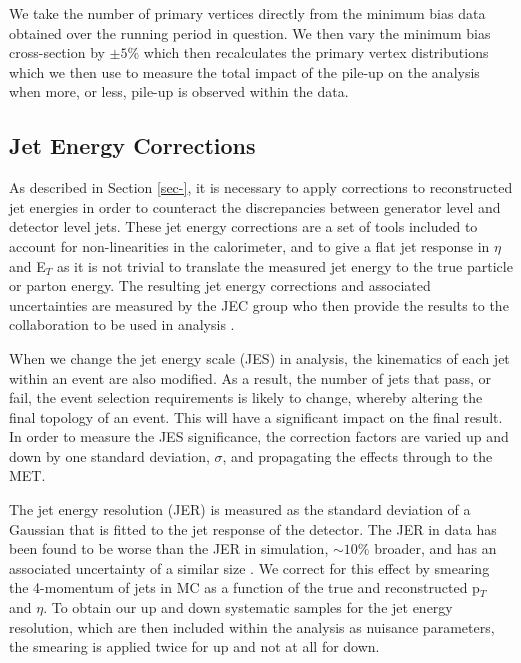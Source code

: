 We take the number of primary vertices directly from the minimum bias data obtained over the running period in question. We then vary the minimum bias cross-section by $\pm5\%$ which then recalculates the primary vertex distributions which we then use to measure the total impact of the pile-up on the analysis when more, or less, pile-up is observed within the data. %


\subsection{Jet Energy Corrections} \label{subsec-JECUncertainty}

As described in Section \ref{sec-}, it is necessary to apply corrections to reconstructed jet energies in order to counteract the discrepancies between generator level and detector level jets. These jet energy corrections are a set of tools included to account for non-linearities in the calorimeter, and to give a flat jet response in $\eta$ and E$_T$ as it is not trivial to translate the measured jet energy to the true particle or parton energy. The resulting jet energy corrections and associated uncertainties are measured by the JEC group who then provide the results to the collaboration to be used in analysis \cite{1748-0221-6-11-P11002, CMS-DP-2013-033}.

When we change the jet energy scale (JES) in analysis, the kinematics of each jet within an event are also modified. As a result, the number of jets that pass, or fail, the event selection requirements is likely to change, whereby altering the final topology of an event. This will have a significant impact on the final result. In order to measure the JES significance, the correction factors are varied up and down by one standard deviation, $\sigma$, and propagating the effects through to the MET. %

The jet energy resolution (JER) is measured as the standard deviation of a Gaussian that is fitted to the jet response of the detector. The JER in data has been found to be worse than the JER in simulation, $\sim 10\%$ broader, and has an associated uncertainty of a similar size \cite{CMS:2011esa}. We correct for this effect by smearing the 4-momentum of jets in MC as a function of the true and reconstructed p$_T$ and $\eta$. To obtain our up and down systematic samples for the jet energy resolution, which are then included within the analysis as nuisance parameters, the smearing is applied twice for up and not at all for down. %

